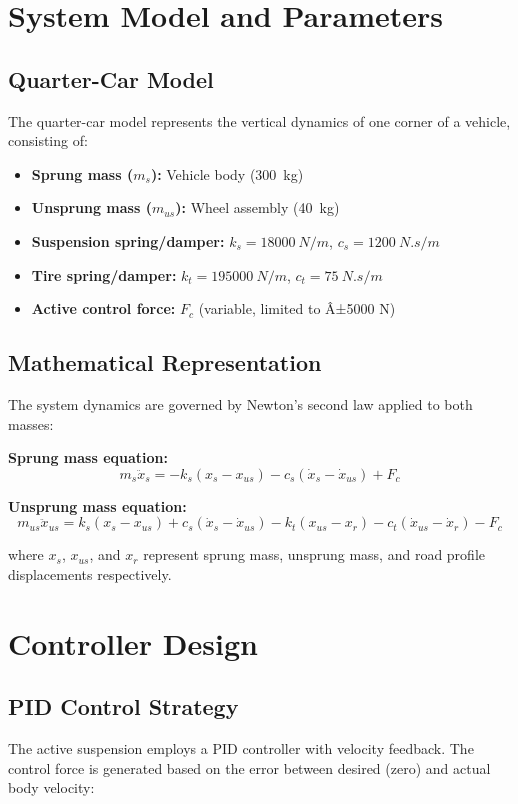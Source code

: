\documentclass[12pt,a4paper]{article}
\begin{document}
\section{System Model and Parameters}

\subsection{Quarter-Car Model}
The quarter-car model represents the vertical dynamics of one corner of a vehicle, consisting of:
\begin{itemize}
    \item \textbf{Sprung mass ($m_s$):} Vehicle body (\SI{300}{kg})
    \item \textbf{Unsprung mass ($m_{us}$):} Wheel assembly (\SI{40}{kg})
    \item \textbf{Suspension spring/damper:} $k_s = \SI{18000}{N/m}$, $c_s = \SI{1200}{N.s/m}$
    \item \textbf{Tire spring/damper:} $k_t = \SI{195000}{N/m}$, $c_t = \SI{75}{N.s/m}$
    \item \textbf{Active control force:} $F_c$ (variable, limited to Â±5000 N)
\end{itemize}

\subsection{Mathematical Representation}
The system dynamics are governed by Newton's second law applied to both masses:

\textbf{Sprung mass equation:}
\begin{equation}
    m_s \ddot{x}_s = -k_s(x_s - x_{us}) - c_s(\dot{x}_s - \dot{x}_{us}) + F_c
\end{equation}

\textbf{Unsprung mass equation:}
\begin{equation}
    m_{us} \ddot{x}_{us} = k_s(x_s - x_{us}) + c_s(\dot{x}_s - \dot{x}_{us}) - k_t(x_{us} - x_r) - c_t(\dot{x}_{us} - \dot{x}_r) - F_c
\end{equation}

where $x_s$, $x_{us}$, and $x_r$ represent sprung mass, unsprung mass, and road profile displacements respectively.

\section{Controller Design}

\subsection{PID Control Strategy}
The active suspension employs a PID controller with velocity feedback. The control force is generated based on the error between desired (zero) and actual body velocity:
\end{document}
